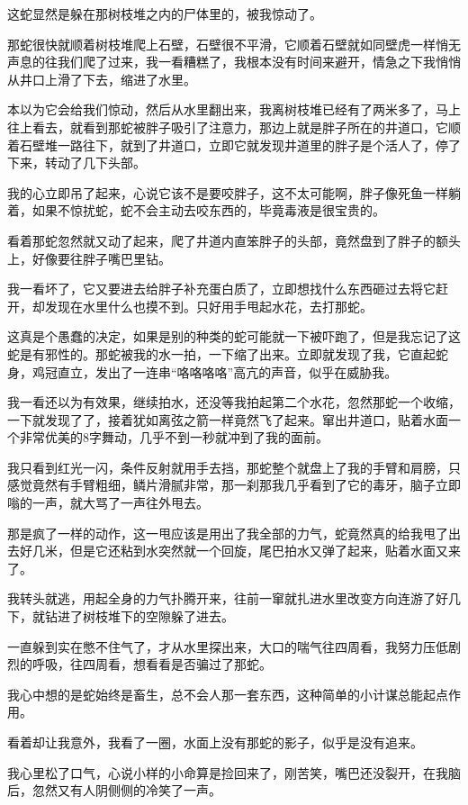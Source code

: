 这蛇显然是躲在那树枝堆之内的尸体里的，被我惊动了。

那蛇很快就顺着树枝堆爬上石壁，石壁很不平滑，它顺着石壁就如同壁虎一样悄无声息的往我们爬了过来，我一看糟糕了，我根本没有时间来避开，情急之下我悄悄从井口上滑了下去，缩进了水里。

本以为它会给我们惊动，然后从水里翻出来，我离树枝堆已经有了两米多了，马上往上看去，就看到那蛇被胖子吸引了注意力，那边上就是胖子所在的井道口，它顺着石壁堆一路往下，就到了井道口，立即它就发现井道里的胖子是个活人了，停了下来，转动了几下头部。

我的心立即吊了起来，心说它该不是要咬胖子，这不太可能啊，胖子像死鱼一样躺着，如果不惊扰蛇，蛇不会主动去咬东西的，毕竟毒液是很宝贵的。

看着那蛇忽然就又动了起来，爬了井道内直笨胖子的头部，竟然盘到了胖子的额头上，好像要往胖子嘴巴里钻。

我一看坏了，它又要进去给胖子补充蛋白质了，立即想找什么东西砸过去将它赶开，却发现在水里什么也摸不到。只好用手甩起水花，去打那蛇。

这真是个愚蠢的决定，如果是别的种类的蛇可能就一下被吓跑了，但是我忘记了这蛇是有邪性的。那蛇被我的水一拍，一下缩了出来。立即就发现了我，它直起蛇身，鸡冠直立，发出了一连串“咯咯咯咯”高亢的声音，似乎在威胁我。

我一看还以为有效果，继续拍水，还没等我拍起第二个水花，忽然那蛇一个收缩，一下就发现了了，接着犹如离弦之箭一样竟然飞了起来。窜出井道口，贴着水面一个非常优美的8字舞动，几乎不到一秒就冲到了我的面前。

我只看到红光一闪，条件反射就用手去挡，那蛇整个就盘上了我的手臂和肩膀，只感觉竟然有手臂粗细，鳞片滑腻非常，那一刹那我几乎看到了它的毒牙，脑子立即嗡的一声，就大骂了一声往外甩去。

那是疯了一样的动作，这一甩应该是用出了我全部的力气，蛇竟然真的给我甩了出去好几米，但是它还粘到水突然就一个回旋，尾巴拍水又弹了起来，贴着水面又来了。

我转头就逃，用起全身的力气扑腾开来，往前一窜就扎进水里改变方向连游了好几下，就钻进了树枝堆下的空隙躲了进去。

一直躲到实在憋不住气了，才从水里探出来，大口的喘气往四周看，我努力压低剧烈的呼吸，往四周看，想看看是否骗过了那蛇。

我心中想的是蛇始终是畜生，总不会人那一套东西，这种简单的小计谋总能起点作用。

看着却让我意外，我看了一圈，水面上没有那蛇的影子，似乎是没有追来。

我心里松了口气，心说小样的小命算是捡回来了，刚苦笑，嘴巴还没裂开，在我脑后，忽然又有人阴侧侧的冷笑了一声。

